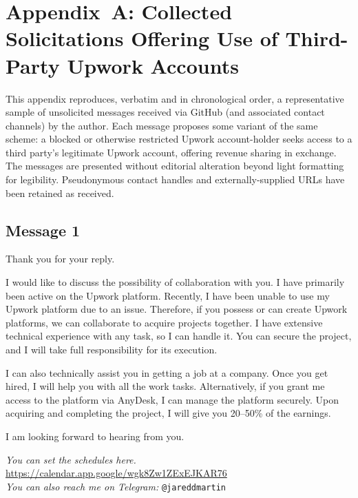 \documentclass[11pt]{article}
\newcommand{\sender}[2]{%
  \medskip
  \noindent{\small\textbf{From:} #1 \hfill \textbf{Date:} #2}\par
  \smallskip
}
\begin{document}
\section*{Appendix~A: Collected Solicitations Offering Use of Third-Party
Upwork Accounts}

\bigskip

\noindent This appendix reproduces, verbatim and in chronological order, a
representative sample of unsolicited messages received via GitHub (and
associated contact channels) by the author. Each message proposes some variant
of the same scheme: a blocked or otherwise restricted Upwork account-holder
seeks access to a third party's legitimate Upwork account, offering revenue
sharing in exchange. The messages are presented without editorial alteration
beyond light formatting for legibility. Pseudonymous contact handles and
externally-supplied URLs have been retained as received.

\bigskip

\subsection*{Message 1}

\sender{Roman}{2026-04-18}

\begin{msgbox}
Thank you for your reply.

I would like to discuss the possibility of collaboration with you. I have
primarily been active on the Upwork platform. Recently, I have been unable to
use my Upwork platform due to an issue. Therefore, if you possess or can create
Upwork platforms, we can collaborate to acquire projects together. I have
extensive technical experience with any task, so I can handle it. You can secure
the project, and I will take full responsibility for its execution.

I can also technically assist you in getting a job at a company. Once you get
hired, I will help you with all the work tasks. Alternatively, if you grant me
access to the platform via AnyDesk, I can manage the platform securely. Upon
acquiring and completing the project, I will give you 20–50\% of the earnings.

I am looking forward to hearing from you.

\smallskip
\noindent\textit{You can set the schedules here.}
\url{https://calendar.app.google/wgk8Zw1ZExEJKAR76}\\
\textit{You can also reach me on Telegram:} \texttt{@jareddmartin}
\end{msgbox}
\end{document}
